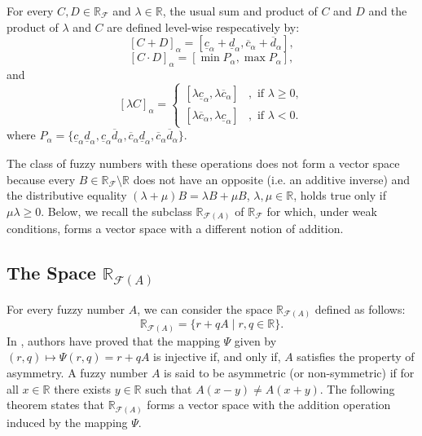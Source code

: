 \documentclass[12pt,a4paper]{article}
\newcommand{\RR}{\mathbb{R}}
\newcommand{\RF}{\mathbb{R}_\mathcal{F}}
\newcommand{\RFA}{\mathbb{R}_{\mathcal{F}(A)}}
\begin{document}
For every $C,D \in \RF$ and $\lambda \in \RR$, the usual sum and product of $C$ and $D$ and the product of $\lambda$ and $C$ are  defined level-wise respecatively by:
\begin{equation}\label{somausual}
[C + D]_\alpha = [\underline{c}_\alpha + \underline{d}_\alpha, \overline{c}_\alpha + \overline{d}_\alpha],
\end{equation}
\begin{equation}\label{produtousual}
[C \cdot D]_\alpha = [\min P_\alpha, \max P_\alpha],
\end{equation}
and 
\begin{equation}\label{prodescalarusual}
[\lambda C]_\alpha = \left\lbrace \begin{array}{cl}
 \left[\lambda \underline{c}_\alpha, \lambda\overline{c}_\alpha\right]    &, \mbox{ if }  \lambda \geq 0, \\
 \left[\lambda \overline{c}_\alpha, \lambda\underline{c}_\alpha\right]    &, \mbox{ if }  \lambda < 0. 
\end{array}\right.     
\end{equation}
 where $P_\alpha = \{\underline{c}_\alpha\underline{d}_\alpha, \underline{c}_\alpha\overline{d}_\alpha,
\overline{c}_\alpha\underline{d}_\alpha,\overline{c}_\alpha\overline{d}_\alpha\}.$ 

The class of fuzzy numbers with these operations does not form a vector space because every 
$B \in \RF \setminus \RR$ does not have an opposite (i.e. an additive inverse) and the distributive 
equality $(\lambda + \mu)B = \lambda B + \mu B$, $\lambda, \mu \in \RR$, holds true only if $\mu\lambda \geq 0$. Below, we recall the subclass $\RFA$ of $\RF$ for which, under weak conditions, forms a vector space with a different notion of addition.  

\subsection{The Space $\RFA$}

For every fuzzy number $A$, we can consider the space $\RFA$ defined as follows:
\begin{equation}
\RFA = \{r + qA \mid r,q \in \RR \}.
\end{equation}
In \cite{esmi2018frechet}, authors have proved that the mapping $\Psi$ given by $(r,q)\mapsto \Psi(r,q) = r + qA$ is injective if, and only if, $A$ satisfies the property of asymmetry.
A fuzzy number $A$ is said to be asymmetric (or non-symmetric) if for all $x \in \RR$ there exists $y \in \RR$ such that $A(x-y) \neq A(x+y)$. The following theorem states that  $\RFA$ forms a vector space with the addition operation induced by the mapping $\Psi$. 
\end{document}
